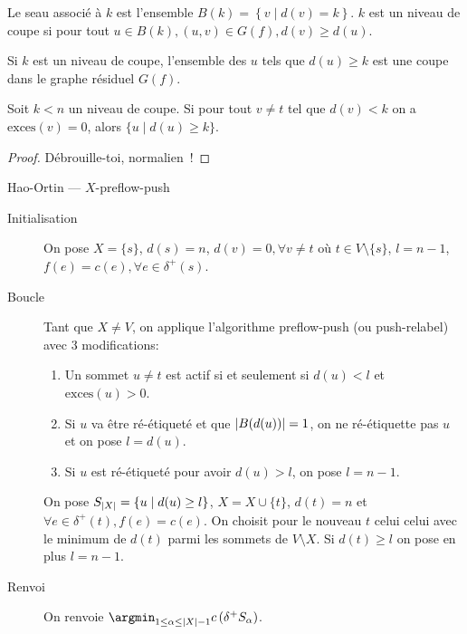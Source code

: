 \documentclass[math, info]{cours}
\begin{document}
\begin{definition}
	Le seau associé à $k$ est l'ensemble $B(k) = \left\{v \mid d(v) = k\right\}$.
	$k$ est un niveau de coupe si pour tout $u \in B(k), (u, v) \in G(f), d(v) \geq d(u)$.
	\label{def:bucketlevel}
\end{definition}

\begin{proposition}
	Si $k$ est un niveau de coupe, l'ensemble des $u$ tels que $d(u) \geq k$ est une coupe dans le graphe résiduel $G(f)$.
	\label{prop:cutleveliscut}
\end{proposition}

\begin{proposition}
	Soit $k < n$ un niveau de coupe. Si pour tout $v \neq t$ tel que $d(v) < k$ on a $\mathrm{exces}(v) = 0$, alors $\{u \mid d(u) \geq k\}$.
	\label{prop:cutlevelexcess}
\end{proposition}
\begin{proof}
	Débrouille-toi, normalien~!
\end{proof}

\begin{algorithm}
	\caption{Hao-Ortin --- $X$-preflow-push}
	\begin{description}
		\item[Initialisation] On pose $X = \{s\}$, $d(s) = n$, $d(v) = 0, \forall v \neq t$ où $t \in V \setminus\{s\}$,
		      $l = n - 1$, $f(e) = c(e), \forall e \in \delta^{+}(s)$.
		\item[Boucle] Tant que $X \neq V$, on applique l'algorithme preflow-push (ou push-relabel) avec 3 modifications:
		      \begin{enumerate}
			      \item Un sommet $u \neq t$ est actif si et seulement si $d(u) < l$ et $\mathrm{exces}(u) > 0$.
			      \item Si $u$ va être ré-étiqueté et que $\left|B(d(u))\right| = 1$, on ne ré-étiquette pas $u$ et on pose $l = d(u)$.
			      \item Si $u$ est ré-étiqueté pour avoir $d(u) > l$, on pose $l = n - 1$.
		      \end{enumerate}
		      On pose $S_{\left|X\right|} = \left\{u \mid d(u) \geq l\right\}$, $X = X \cup \{t\}$, $d(t) = n$ et $\forall e \in \delta^{+}(t), f(e) = c(e)$.
		      On choisit pour le nouveau $t$ celui celui avec le minimum de $d(t)$ parmi les sommets de $V \setminus X$.
		      Si $d(t) \geq l$ on pose en plus $l = n - 1$.
		\item[Renvoi] On renvoie $\argmin_{1 \leq \alpha \leq \abs{X} - 1} c\left(\delta^{+}S_{\alpha} \right)$.
	\end{description}
	\label{alg:haoortin}
\end{algorithm}
\end{document}
